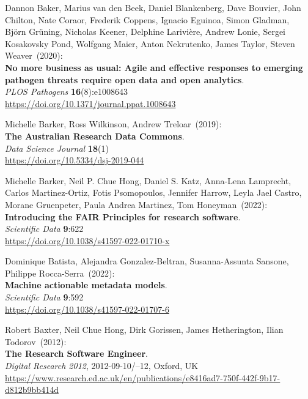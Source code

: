 \begin{thebibliography}{9}
Dannon Baker, Marius van den Beek, Daniel Blankenberg, Dave
Bouvier, John Chilton, Nate Coraor, Frederik Coppens, Ignacio Eguinoa,
Simon Gladman, Björn Grüning, Nicholas Keener, Delphine Larivière,
Andrew Lonie, Sergei Kosakovsky Pond, Wolfgang Maier, Anton Nekrutenko,
James Taylor, Steven Weaver~(2020): \\
\textbf{No more business as usual: Agile and effective responses to
emerging pathogen threats require open data and open analytics}.\\
\emph{PLOS Pathogens} \textbf{16}(8):e1008643 \\
\url{https://doi.org/10.1371/journal.ppat.1008643}

Michelle Barker, Ross Wilkinson, Andrew Treloar~(2019): \\
\textbf{The Australian Research Data Commons}.\\
\emph{Data Science Journal} \textbf{18}(1) \\
\url{https://doi.org/10.5334/dsj-2019-044}

Michelle Barker, Neil P. Chue Hong, Daniel S. Katz, Anna-Lena Lamprecht, Carlos Martinez-Ortiz, Fotis Psomopoulos, Jennifer Harrow, Leyla Jael Castro, Morane Gruenpeter, Paula Andrea Martinez, Tom Honeyman~(2022):\\
\textbf{Introducing the FAIR Principles for research software}.\\
\emph{Scientific Data} \textbf{9}:622 \\
\url{https://doi.org/10.1038/s41597-022-01710-x}

Dominique Batista, Alejandra Gonzalez-Beltran, Susanna-Assunta Sansone, Philippe Rocca-Serra~(2022): \\
\textbf{Machine actionable metadata models}.\\
\emph{Scientific Data} \textbf{9}:592 \\
\url{https://doi.org/10.1038/s41597-022-01707-6}

Robert Baxter, Neil Chue Hong, Dirk Gorissen, James Hetherington, Ilian Todorov~(2012): \\
\textbf{The Research Software Engineer}.\\
\emph{Digital Research 2012}, 2012-09-10/--12, Oxford, UK\\
\url{https://www.research.ed.ac.uk/en/publications/e8416ad7-750f-442f-9b17-d812b9bb414d}


\end{thebibliography}
